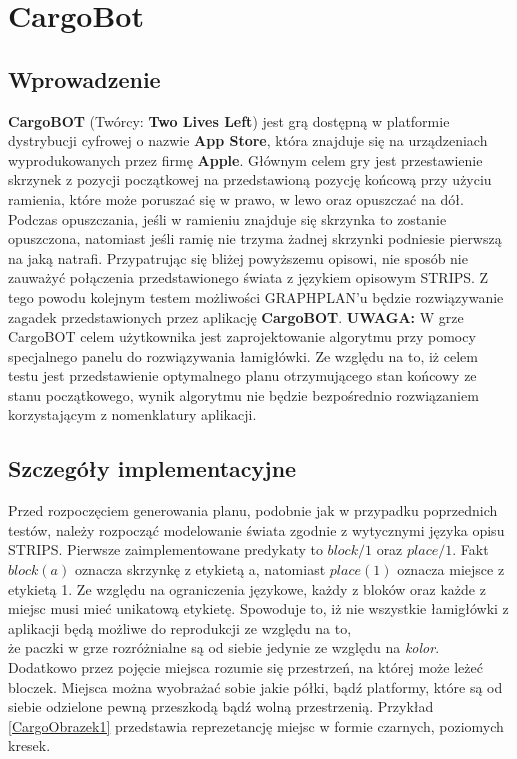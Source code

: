 \section{CargoBot}
\label{CargoBotTest}
    \subsection{Wprowadzenie}
        \textbf{CargoBOT} (Twórcy: \textbf{Two Lives Left}) jest grą dostępną w platformie dystrybucji cyfrowej o nazwie \textbf{App Store},
        która znajduje się na urządzeniach wyprodukowanych przez firmę \textbf{Apple}. 
        Głównym celem gry jest przestawienie skrzynek z pozycji początkowej na przedstawioną 
        pozycję końcową przy użyciu ramienia, które może poruszać się w prawo, w lewo oraz opuszczać na dół. Podczas opuszczania, jeśli w 
        ramieniu znajduje się skrzynka to zostanie opuszczona, natomiast jeśli ramię nie trzyma żadnej skrzynki podniesie pierwszą na jaką 
        natrafi. Przypatrując się bliżej powyższemu opisowi, nie sposób nie zauważyć połączenia przedstawionego świata z językiem opisowym 
        STRIPS. Z tego powodu kolejnym testem możliwości GRAPHPLAN'u będzie rozwiązywanie zagadek przedstawionych przez aplikację \textbf{CargoBOT}.
        \textbf{UWAGA: } W grze CargoBOT celem użytkownika jest zaprojektowanie algorytmu przy pomocy specjalnego panelu do rozwiązywania łamigłówki.
        Ze względu na to, iż celem testu jest przedstawienie optymalnego planu otrzymującego stan końcowy ze stanu początkowego, wynik algorytmu 
        nie będzie bezpośrednio rozwiązaniem korzystającym z nomenklatury aplikacji.
    \subsection{Szczegóły implementacyjne}
    Przed rozpoczęciem generowania planu, podobnie jak w przypadku poprzednich testów, należy rozpocząć modelowanie świata zgodnie z wytycznymi 
    języka opisu STRIPS. Pierwsze zaimplementowane predykaty to $block/1$ oraz $place/1$. Fakt $block(a)$ oznacza skrzynkę z etykietą a, natomiast 
    $place(1)$ oznacza miejsce z etykietą 1. Ze względu na ograniczenia językowe, każdy z bloków oraz każde z miejsc musi mieć unikatową etykietę. 
    Spowoduje to, iż nie wszystkie łamigłówki z aplikacji będą możliwe do reprodukcji ze względu na to, \\
    że paczki w grze rozróżnialne są od siebie 
    jedynie ze względu na \textit{kolor}. Dodatkowo przez pojęcie miejsca rozumie się przestrzeń, na której może leżeć bloczek. Miejsca można
    wyobrażać sobie jakie półki, bądź platformy, które są od siebie odzielone pewną przeszkodą bądź wolną przestrzenią. Przykład \ref{CargoObrazek1}
    przedstawia reprezetancję miejsc w formie czarnych, poziomych kresek. 
    
